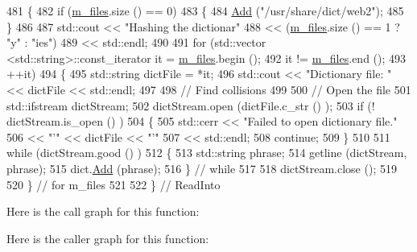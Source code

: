 \begin{DoxyCode}
481   \{
482     \textcolor{keywordflow}{if} (\hyperlink{classns3_1_1Hash_1_1Example_1_1DictFiles_a0f2c70e08b9eb66a95eb08637ddf6f92}{m\_files}.size () == 0)
483       \{
484         \hyperlink{classns3_1_1Hash_1_1Example_1_1DictFiles_a2c1ef714c9da605160b3e2d661985bc9}{Add} (\textcolor{stringliteral}{"/usr/share/dict/web2"});
485       \}
486 
487     std::cout << \textcolor{stringliteral}{"Hashing the dictionar"}
488               << (\hyperlink{classns3_1_1Hash_1_1Example_1_1DictFiles_a0f2c70e08b9eb66a95eb08637ddf6f92}{m\_files}.size () == 1 ? \textcolor{stringliteral}{"y"} : \textcolor{stringliteral}{"ies"})
489               << std::endl;
490 
491     \textcolor{keywordflow}{for} (std::vector <std::string>::const\_iterator it = \hyperlink{classns3_1_1Hash_1_1Example_1_1DictFiles_a0f2c70e08b9eb66a95eb08637ddf6f92}{m\_files}.begin ();
492          it != \hyperlink{classns3_1_1Hash_1_1Example_1_1DictFiles_a0f2c70e08b9eb66a95eb08637ddf6f92}{m\_files}.end ();
493          ++it)
494       \{
495         std::string dictFile = *it;
496         std::cout << \textcolor{stringliteral}{"Dictionary file: "} << dictFile << std::endl;
497   
498         \textcolor{comment}{// Find collisions}
499   
500         \textcolor{comment}{// Open the file}
501         std::ifstream dictStream;
502         dictStream.open (dictFile.c\_str () );
503         \textcolor{keywordflow}{if} (! dictStream.is\_open () )
504           \{
505             std::cerr << \textcolor{stringliteral}{"Failed to open dictionary file."}
506                       << \textcolor{stringliteral}{"'"} << dictFile << \textcolor{stringliteral}{"'"}
507                       << std::endl;
508             \textcolor{keywordflow}{continue};
509           \}
510     
511         \textcolor{keywordflow}{while} (dictStream.good () )
512           \{
513             std::string phrase;
514             getline (dictStream, phrase);
515             dict.\hyperlink{classns3_1_1Hash_1_1Example_1_1Dictionary_a091918961277b192b334cd5241f1c660}{Add} (phrase);
516           \}  \textcolor{comment}{// while}
517         
518         dictStream.close ();
519 
520       \}  \textcolor{comment}{// for m\_files}
521 
522   \}  \textcolor{comment}{// ReadInto}
\end{DoxyCode}


Here is the call graph for this function\+:




Here is the caller graph for this function\+:




